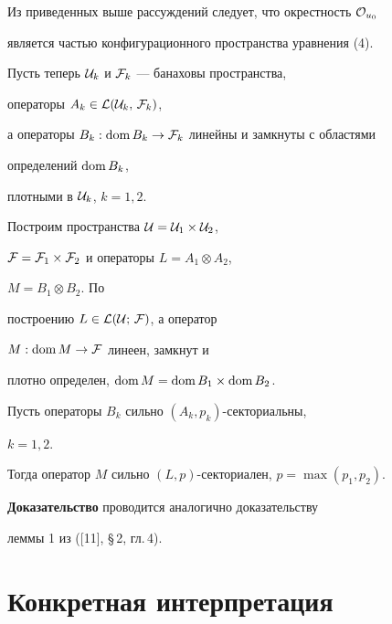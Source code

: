 \begin{note}


Из приведенных выше рассуждений следует, что окрестность ${\cal O}_{u_0}$


является частью конфигурационного пространства уравнения (4).


\end{note}





Пусть теперь ${\cal U}_k $ и ${\cal F}_k $ --- банаховы пространства,


операторы $A_k \in {\cal L}({\cal U}_k,\,{\cal F}_k)$,


а операторы $B_k: \operatorname{dom} B_k \to {\cal F}_k$ линейны и замкнуты с областями


определений $\operatorname{dom} B_k$,


плотными в ${\cal U}_k$, $k=1,2$.


Построим пространства ${\cal U}={\cal U}_1 \times {\cal U}_2$,


${\cal F}={\cal F}_1 \times {\cal F}_2 $ и операторы $L=A_1 \otimes A_2$,


$M=B_1 \otimes B_2$. По


построению $L \in {\cal L(\cal U;\,\cal F)}$, а оператор


$M: \operatorname{dom} M \to {\cal F}$ линеен, замкнут и


плотно определен, $\operatorname{dom} M=\operatorname{dom} B_1 \times \operatorname{dom} B_2$.





\begin{thm}


Пусть операторы $B_k$ сильно $(A_k,p_k)$-секториальны,


$k=1,2$.


Тогда оператор $M$ сильно $(L,p)$-секториален, $p=\max (p_1,p_2)$.


\end{thm}





{\bf Доказательство} проводится аналогично доказательству


леммы 1 из ([11], \S\,2, гл.\,4).








\section{Конкретная интерпретация}





